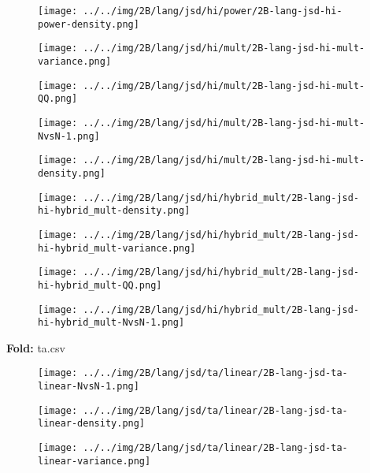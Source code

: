 \begin{figure}[H]
\centering	\texttt{[image: ../../img/2B/lang/jsd/hi/power/2B-lang-jsd-hi-power-density.png]}
\end{figure}
\begin{figure}[H]
\centering	\texttt{[image: ../../img/2B/lang/jsd/hi/mult/2B-lang-jsd-hi-mult-variance.png]}
\end{figure}
\begin{figure}[H]
\centering	\texttt{[image: ../../img/2B/lang/jsd/hi/mult/2B-lang-jsd-hi-mult-QQ.png]}
\end{figure}
\begin{figure}[H]
\centering	\texttt{[image: ../../img/2B/lang/jsd/hi/mult/2B-lang-jsd-hi-mult-NvsN-1.png]}
\end{figure}
\begin{figure}[H]
\centering	\texttt{[image: ../../img/2B/lang/jsd/hi/mult/2B-lang-jsd-hi-mult-density.png]}
\end{figure}
\begin{figure}[H]
\centering	\texttt{[image: ../../img/2B/lang/jsd/hi/hybrid\_mult/2B-lang-jsd-hi-hybrid\_mult-density.png]}
\end{figure}
\begin{figure}[H]
\centering	\texttt{[image: ../../img/2B/lang/jsd/hi/hybrid\_mult/2B-lang-jsd-hi-hybrid\_mult-variance.png]}
\end{figure}
\begin{figure}[H]
\centering	\texttt{[image: ../../img/2B/lang/jsd/hi/hybrid\_mult/2B-lang-jsd-hi-hybrid\_mult-QQ.png]}
\end{figure}
\begin{figure}[H]
\centering	\texttt{[image: ../../img/2B/lang/jsd/hi/hybrid\_mult/2B-lang-jsd-hi-hybrid\_mult-NvsN-1.png]}
\end{figure}
\textbf{Fold:} ta.csv
\begin{figure}[H]
\centering	\texttt{[image: ../../img/2B/lang/jsd/ta/linear/2B-lang-jsd-ta-linear-NvsN-1.png]}
\end{figure}
\begin{figure}[H]
\centering	\texttt{[image: ../../img/2B/lang/jsd/ta/linear/2B-lang-jsd-ta-linear-density.png]}
\end{figure}
\begin{figure}[H]
\centering	\texttt{[image: ../../img/2B/lang/jsd/ta/linear/2B-lang-jsd-ta-linear-variance.png]}
\end{figure}
